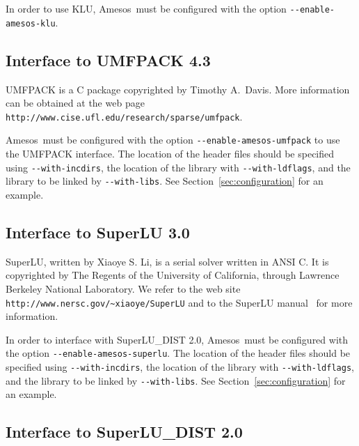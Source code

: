 \documentclass[11pt]{SANDreport}
\newcommand{\amesos}{{\sc Amesos}}
\begin{document}
In order to use KLU, \amesos\ must be configured with the option
\verb!--enable-amesos-klu!.

\subsection{Interface to UMFPACK 4.3}
\label{sec:umfpack}

UMFPACK is a C package copyrighted by Timothy A.~Davis. More information
can be obtained at the web page
\verb!http://www.cise.ufl.edu/research/sparse/umfpack!.

\amesos\ must be configured with the option
\verb!--enable-amesos-umfpack! to use the UMFPACK interface.  The location of the header files should be
specified using \verb!--with-incdirs!, the location of the library with
\verb!--with-ldflags!, and the library to be linked by \verb!--with-libs!. See
Section~\ref{sec:configuration} for an example.

\subsection{Interface to SuperLU 3.0}
\label{sec:superlu}

SuperLU, written by Xiaoye S. Li, is a serial solver
written in ANSI C. It is copyrighted by The Regents of the University of
California, through Lawrence Berkeley National Laboratory.  We refer to
the web site
\verb!http://www.nersc.gov/~xiaoye/SuperLU!
and to the SuperLU manual~\cite{superlu-manual} for more
information.

In order to interface with SuperLU\_DIST 2.0, \amesos\ must be configured with
the option \verb!--enable-amesos-superlu!.
The location of the header files should be specified using \verb!--with-incdirs!,
the location of the library with \verb!--with-ldflags!, and the library
to be linked by \verb!--with-libs!. See Section~\ref{sec:configuration} for an
example.

\subsection{Interface to SuperLU\_DIST 2.0}
\label{sec:superludist}
\end{document}
